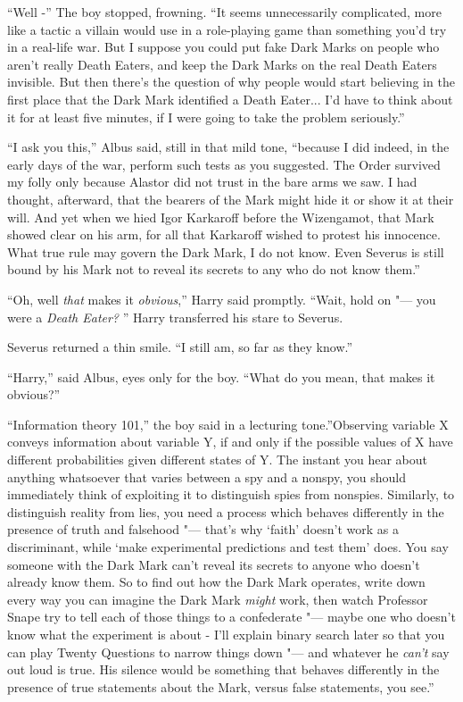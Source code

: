 ``Well -'' The boy stopped, frowning. ``It seems unnecessarily
complicated, more like a tactic a villain would use in a role-playing
game than something you'd try in a real-life war. But I suppose you
could put fake Dark Marks on people who aren't really Death Eaters, and
keep the Dark Marks on the real Death Eaters invisible. But then there's
the question of why people would start believing in the first place that
the Dark Mark identified a Death Eater... I'd have to think about
it for at least five minutes, if I were going to take the problem
seriously.''

``I ask you this,'' Albus said, still in that mild tone, ``because I did
indeed, in the early days of the war, perform such tests as you
suggested. The Order survived my folly only because Alastor did not
trust in the bare arms we saw. I had thought, afterward, that the
bearers of the Mark might hide it or show it at their will. And yet when
we hied Igor Karkaroff before the Wizengamot, that Mark showed clear on
his arm, for all that Karkaroff wished to protest his innocence. What
true rule may govern the Dark Mark, I do not know. Even Severus is still
bound by his Mark not to reveal its secrets to any who do not know
them.''

``Oh, well \emph{that} makes it \emph{obvious},'' Harry said promptly.
``Wait, hold on "--- you were a \emph{Death Eater?} '' Harry transferred his
stare to Severus.

Severus returned a thin smile. ``I still am, so far as they know.''

``Harry,'' said Albus, eyes only for the boy. ``What do you mean, that
makes it obvious?''

``Information theory 101,'' the boy said in a lecturing tone.''Observing
variable X conveys information about variable Y, if and only if the
possible values of X have different probabilities given different states
of Y. The instant you hear about anything whatsoever that varies between
a spy and a nonspy, you should immediately think of exploiting it to
distinguish spies from nonspies. Similarly, to distinguish reality from
lies, you need a process which behaves differently in the presence of
truth and falsehood "--- that's why `faith' doesn't work as a discriminant,
while `make experimental predictions and test them' does. You say
someone with the Dark Mark can't reveal its secrets to anyone who
doesn't already know them. So to find out how the Dark Mark operates,
write down every way you can imagine the Dark Mark \emph{might} work,
then watch Professor Snape try to tell each of those things to a
confederate "--- maybe one who doesn't know what the experiment is about -
I'll explain binary search later so that you can play Twenty Questions
to narrow things down "--- and whatever he \emph{can't} say out loud is
true. His silence would be something that behaves differently in the
presence of true statements about the Mark, versus false statements, you
see.''

